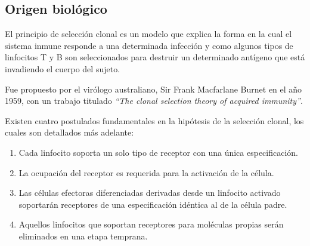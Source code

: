 \subsection{Origen biológico}

El principio de selección clonal es un modelo que explica la forma en la cual el sistema inmune
responde a una determinada infección y como algunos tipos de linfocitos T y B son seleccionados
para destruir un determinado antígeno que está invadiendo el cuerpo del sujeto.

Fue propuesto por el virólogo australiano, Sir Frank Macfarlane Burnet en el año 1959,
con un trabajo titulado \emph{``The clonal selection theory of acquired immunity''}.

Existen cuatro postulados fundamentales en la hipótesis de la selección clonal, los cuales son detallados más adelante:
\begin{enumerate}
	\item Cada linfocito soporta un solo tipo de receptor con una única especificación.
	\item La ocupación del receptor es requerida para la activación de la célula.
	\item Las células efectoras diferenciadas derivadas desde un linfocito activado soportarán receptores de una especificación idéntica al de la célula padre.
	\item Aquellos linfocitos que soportan receptores para moléculas propias serán eliminados en una etapa temprana.
\end{enumerate}


